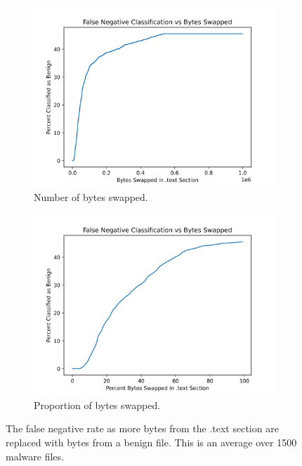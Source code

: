 \documentclass{article}
\begin{document}
\begin{figure}[h]
	\centering
	\begin{subfigure}{.5\textwidth}
		\centering
		\includegraphics[scale=.5]{./figures/inc_benign/proportion_negative_vs_swap_absolute_any.png}
		\caption{Number of bytes swapped.}
	\end{subfigure}%
	\begin{subfigure}{.5\textwidth}
		\centering
		\includegraphics[scale=.5]{./figures/inc_benign/proportion_negative_vs_swap_proportion_any.png}
		\caption{Proportion of bytes swapped.}
	\end{subfigure}
	\caption{The false negative rate as more bytes from the .text section are replaced with bytes from a benign file. This is an average over 1500 malware files.}
\end{figure}
\end{document}
